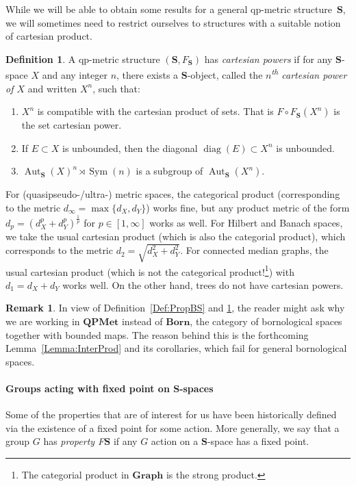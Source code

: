 \documentclass[a4paper]{article}
\newcounter{mycomment}
\newcommand{\mycomment}[2][]{\refstepcounter{mycomment}{\todo[color={green!33},size=\small]{\textbf{Commentaire [\uppercase{#1}\themycomment]:}~#2}}}
\newcommand{\PH}[1]{\todo[color={blue!33},size=small]{#1}}
\newcommand{\GS}[1]{\mycomment[GS]{#1}}
\theoremstyle{definition}
\newtheorem{defn}[lem]{Definition}
\newtheorem{rem}[lem]{Remark}
\DeclareMathOperator\Sym{Sym}
\DeclareMathOperator\diag{diag}
\DeclareMathOperator\Aut{Aut}
\begin{document}
While we will be able to obtain some results for a general qp-metric structure~$\mathbf{S}$, we will sometimes need to restrict ourselves to structures with a suitable notion of cartesian product.
%
%
\begin{defn}\label{Def:Cartesian}
A qp-metric structure $(\mathbf S,F_{\mathbf S})$ has \emph{cartesian powers} if for any $\mathbf S$-space $X$ and any integer $n$, there exists a $\mathbf S$-object, called the \emph{$n$\textsuperscript{th} cartesian power of $X$} and written $X^n$, such that:
\begin{enumerate}
\item
$X^n$ is compatible with the cartesian product of sets. That is $F\circ F_{\mathbf S}(X^n)$ is the set cartesian power.
\item\label{Condidef:2}
If $E\subset X$ is unbounded, then the diagonal $\diag(E)\subset X^n$ is unbounded.
\item\label{Item:Product}
$\Aut_{\mathbf{S}}(X)^n\rtimes \Sym(n)$ is a subgroup of $\Aut_{\mathbf{S}}(X^n)$.
\end{enumerate}
\end{defn}
%
%
For (quasipseudo-/ultra-) metric spaces, the categorical product (corresponding to the metric $d_\infty=\max\{d_X,d_Y\}$) works fine, but any product metric of the form $d_p=(d_X^p+d_Y^p)^{\frac1p}$ for $p\in[1,\infty]$ works as well.
For Hilbert and Banach spaces, we take the usual cartesian product (which is also the categorial product), which corresponds to the metric $d_2=\sqrt{d_X^2+d_Y^2}$.
For connected median graphs, the usual cartesian product (which is not the categorical product!\footnote{The categorial product in $\mathbf{Graph}$ is the strong product.}) with $d_1=d_X+d_Y$ works well.
On the other hand, trees do not have cartesian powers.
%
%
\begin{rem}
In view of Definition~\ref{Def:PropBS} and \ref{Def:Cartesian}, the reader might ask why we are working in $\mathbf{QPMet}$ instead of $\mathbf{Born}$, the category of bornological spaces together with bounded maps.
The reason behind this is the forthcoming Lemma~\ref{Lemma:InterProd} and its corollaries, which fail for general bornological spaces.%
\end{rem}
%
%
%
%
%
\paragraph{Groups acting with fixed point on \texorpdfstring{$\mathbf S$}{\textbf{S}}-spaces}%
Some of the properties that are of interest for us have been historically defined via the existence of a fixed point for some action. More generally, we say that a group $G$ has \emph{property F$\mathbf S$} if any $G$ action on a $\mathbf S$-space has a fixed point.
\end{document}
